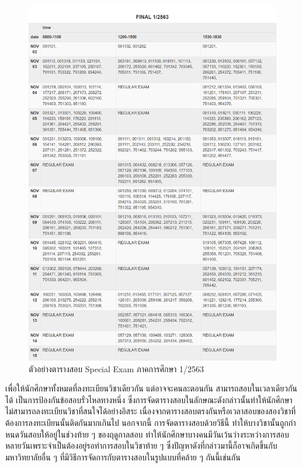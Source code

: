 \begin{figure}
    \centering
    \includegraphics[width=\linewidth]{images/special_exam.png}
    \caption[ตัวอย่างตารางสอบ Special Exam ภาคการศึกษา 1/2563]{ตัวอย่างตารางสอบ Special Exam ภาคการศึกษา 1/2563 \cite{reg-timetable}}
    \label{fig:special_exam}     
\end{figure}
เพื่อให้นักศึกษาทั้งหมดที่ลงทะเบียนวิชาเดียวกัน แต่อาจจะคนละตอนกัน สามารถสอบในเวลาเดียวกันได้ เป็นการป้องกันข้อสอบรั่วไหลทางหนึ่ง 
ซึ่งการจัดตารางสอบในลักษณะดังกล่าวนั้นทําให้นักศึกษาไม่สามารถลงทะเบียนวิชาที่สนใจได้อย่างอิสระ เนื่องจากตารางสอบตรงกันหรือเวลาสอบของสองวิชาที่ต้องการลงทะเบียนนั้นติดกันมากเกินไป นอกจากนี้ การจัดตารางสอบด้วยวิธีนี้ ทำให้บางวิชานั้นถูกกําหนดวันสอบให้อยู่ในช่วงท้าย ๆ ของฤดูกาลสอบ 
ทําให้นักศึกษาบางคนมีวันเว้นว่างระหว่างการสอบหลายวันเพราะจําเป็นต้องอยู่รอทำการสอบในวิชาท้าย ๆ ซึ่งปัญหาดังที่กล่าวมานี้ก็อาจเกิดขึ้นกับมหาวิทยาลัยอื่น ๆ ที่มีวิธีการจัดการกับตารางสอบในรูปแบบที่คล้าย ๆ กันนี้เช่นกัน


